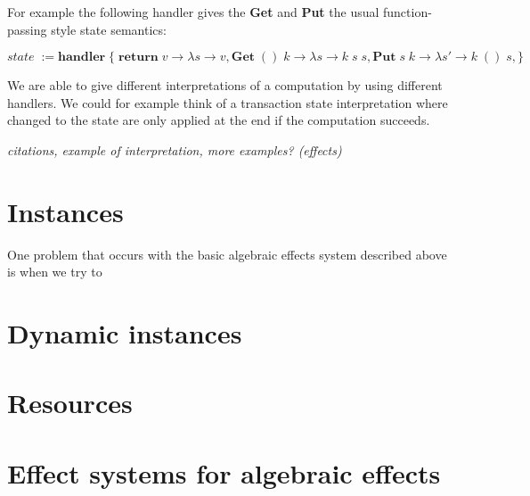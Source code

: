 For example the following handler gives the \textbf{Get} and \textbf{Put} the usual function-passing style state semantics:

\[ \textit{state} \; := \textbf{handler} \; \{ \;
  \textbf{return} \; v \rightarrow \lambda s \rightarrow v,
  \textbf{Get} \; () \; k \rightarrow \lambda s \rightarrow k \; s \; s,
  \textbf{Put} \; s \; k \rightarrow \lambda s' \rightarrow k \; () \; s,
\} \]

We are able to give different interpretations of a computation by using different handlers.
We could for example think of a transaction state interpretation where changed to the state are only applied at the end if the computation succeeds.

\textit{
citations,
example of interpretation,
more examples? (effects)
}

\section{Instances}
One problem that occurs with the basic algebraic effects system described above is when we try to 

\section{Dynamic instances}
\section{Resources}
\section{Effect systems for algebraic effects}
